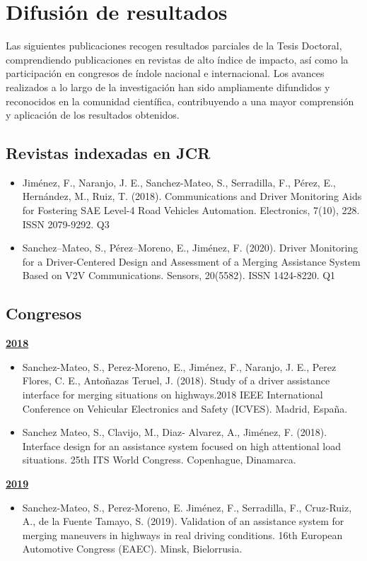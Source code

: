 \section{Difusión de resultados}\label{ch7}
Las siguientes publicaciones recogen resultados parciales de la Tesis Doctoral, comprendiendo publicaciones en revistas de alto índice de impacto, así como la participación en congresos de índole nacional e internacional. Los avances realizados a lo largo de la investigación han sido ampliamente difundidos y reconocidos en la comunidad científica, contribuyendo a una mayor comprensión y aplicación de los resultados obtenidos.

\subsection{Revistas indexadas en JCR}
\begin{itemize}
    \item Jiménez, F., Naranjo, J. E., Sanchez-Mateo, S., Serradilla, F., Pérez, E., Hernández, M., Ruiz, T. (2018). Communications and Driver Monitoring Aids for Fostering SAE Level-4 Road Vehicles Automation. Electronics, 7(10), 228. ISSN 2079-9292. Q3 
    \item Sanchez–Mateo, S., Pérez–Moreno, E., Jiménez, F. (2020). Driver Monitoring for a Driver-Centered Design and Assessment of a Merging Assistance System Based on V2V Communications. Sensors, 20(5582). ISSN 1424-8220. Q1 
    \end{itemize}
    
\subsection{Congresos}

\textbf{\underline{2018}}
\begin{itemize}
    \item Sanchez-Mateo, S., Perez-Moreno, E., Jiménez, F., Naranjo, J. E., Perez Flores, C. E., Antoñazas Teruel, J. (2018). Study of a driver assistance interface for merging situations on highways.2018 IEEE International Conference on Vehicular Electronics and Safety (ICVES). Madrid, España. 
    \item Sanchez Mateo, S., Clavijo, M., Diaz- Alvarez, A., Jiménez, F. (2018). Interface design for an assistance system focused on high attentional load situations. 25th ITS World Congress. Copenhague, Dinamarca. 
    \end{itemize}

\textbf{\underline{2019}}
\begin{itemize}
    \item Sanchez-Mateo, S., Perez-Moreno, E. Jiménez, F., Serradilla, F., Cruz-Ruiz, A., de la Fuente Tamayo, S. (2019). Validation of an assistance system for merging maneuvers in highways in real driving conditions. 16th European Automotive Congress (EAEC). Minsk, Bielorrusia. 
    \end{itemize}

